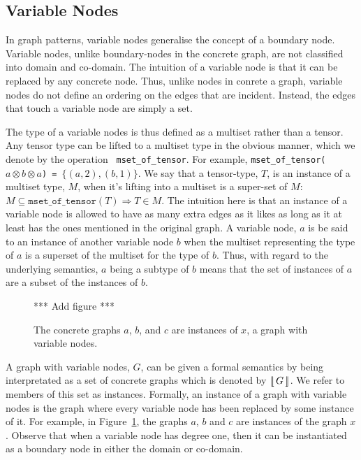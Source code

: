 \documentclass[runningheads]{llncs}
\newcommand{\tensor}{\otimes}
\newcommand{\vinterp}[1]{\lfloor\hspace{-0.27em}|\, #1\, |\hspace{-0.27em}\rfloor}
\begin{document}
\subsection{Variable Nodes}

In graph patterns, variable nodes generalise the concept of a
boundary node. Variable nodes, unlike boundary-nodes in the concrete
graph, are not classified into domain and co-domain. The intuition of
a variable node is that it can be replaced by any concrete node. Thus,
unlike nodes in conrete a graph, variable nodes do not define an
ordering on the edges that are incident. Instead, the edges that touch
a variable node are simply a set.

The type of a variable nodes is thus defined as a multiset rather than
a tensor. Any tensor type can be lifted to a multiset type in the
obvious manner, which we denote by the operation {\tt
  mset\_of\_tensor}. For example, {\tt mset\_of\_tensor($a \tensor b
  \tensor a$) = $\{(a,2), (b,1)\}$}. We say that a tensor-type, $T$,
is an instance of a multiset type, $M$, when it's lifting into a
multiset is a super-set of $M$: $ M \subseteq
\mathtt{mset\_of\_tensor}(T) \Longrightarrow T \in M$. The intuition
here is that an instance of a variable node is allowed to have as many
extra edges as it likes as long as it at least has the ones mentioned
in the original graph. A variable node, $a$ is be said to an instance
of another variable node $b$ when the multiset representing the type of
$a$ is a superset of the multiset for the type of $b$. Thus, with
regard to the underlying semantics, $a$ being a subtype of $b$ means
that the set of instances of $a$ are a subset of the instances of $b$.

\begin{figure}[t]
*** Add figure *** 
\label{node-variable-instances-fig}\caption{The concrete graphs $a$,
  $b$, and $c$ are instances of $x$, a graph with variable nodes.}
\end{figure}

A graph with variable nodes, $G$, can be given a formal semantics by
being interpretated as a set of concrete graphs which is denoted by
$\vinterp{G}$. We refer to members of this set as
instances. Formally, an instance of a graph with variable nodes is the
graph where every variable node has been replaced by some instance of
it. For example, in Figure~\ref{node-variable-instances-fig}, the
graphs $a$, $b$ and $c$ are instances of the graph $x$. Observe that
when a variable node has degree one, then it can be instantiated as a
boundary node in either the domain or co-domain.
\end{document}
